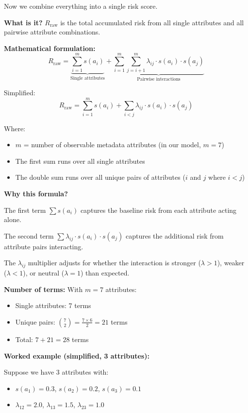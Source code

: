\documentclass[12pt,a4paper,oneside,openany]{report}
\begin{document}
Now we combine everything into a single risk score.

\textbf{What is it?} $R_{\mathrm{raw}}$ is the total accumulated risk from all single attributes and all pairwise attribute combinations.

\textbf{Mathematical formulation:}
\begin{equation}
R_{\mathrm{raw}} = \underbrace{\sum_{i=1}^{m} s(a_i)}_{\text{Single attributes}} + \underbrace{\sum_{i=1}^{m} \sum_{j=i+1}^{m} \lambda_{ij} \cdot s(a_i) \cdot s(a_j)}_{\text{Pairwise interactions}}
\end{equation}

Simplified:
\begin{equation}
R_{\mathrm{raw}} = \sum_{i=1}^{m} s(a_i) + \sum_{i<j} \lambda_{ij} \cdot s(a_i) \cdot s(a_j)
\end{equation}

Where:
\begin{itemize}
    \item $m$ = number of observable metadata attributes (in our model, $m = 7$)
    \item The first sum runs over all single attributes
    \item The double sum runs over all unique pairs of attributes ($i$ and $j$ where $i < j$)
\end{itemize}

\textbf{Why this formula?}

The first term $\sum s(a_i)$ captures the baseline risk from each attribute acting alone.

The second term $\sum \lambda_{ij} \cdot s(a_i) \cdot s(a_j)$ captures the additional risk from attribute pairs interacting.

The $\lambda_{ij}$ multiplier adjusts for whether the interaction is stronger ($\lambda > 1$), weaker ($\lambda < 1$), or neutral ($\lambda = 1$) than expected.

\textbf{Number of terms:} With $m = 7$ attributes:
\begin{itemize}
    \item Single attributes: 7 terms
    \item Unique pairs: $\binom{7}{2} = \frac{7 \times 6}{2} = 21$ terms
    \item Total: $7 + 21 = 28$ terms
\end{itemize}

\textbf{Worked example (simplified, 3 attributes):}

Suppose we have 3 attributes with:
\begin{itemize}
    \item $s(a_1) = 0.3$, $s(a_2) = 0.2$, $s(a_3) = 0.1$
    \item $\lambda_{12} = 2.0$, $\lambda_{13} = 1.5$, $\lambda_{23} = 1.0$
\end{itemize}
\end{document}
